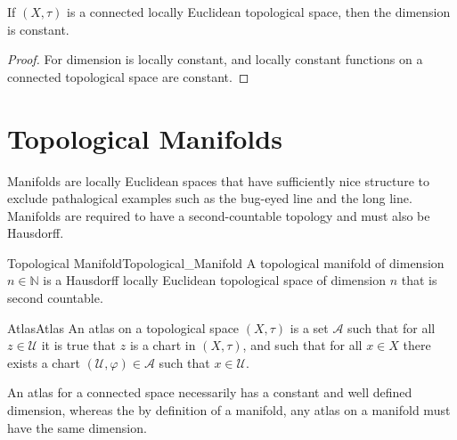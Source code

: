 \documentclass{article}                                                        %
\begin{document}
        \begin{theorem}
                If $(X,\tau)$ is a connected locally Euclidean topological
                space, then the dimension is constant.
        \end{theorem}
        \begin{proof}
                For dimension is locally constant, and locally constant
                functions on a connected topological space are constant.
        \end{proof}
    \section{Topological Manifolds}
        Manifolds are locally Euclidean spaces that have sufficiently nice
        structure to exclude pathalogical examples such as the bug-eyed line
        and the long line. Manifolds are required to have a second-countable
        topology and must also be Hausdorff.
        \begin{fdefinition}{Topological Manifold}{Topological_Manifold}
            A topological manifold of dimension $n\in\mathbb{N}$ is a
            Hausdorff locally Euclidean topological space of dimension $n$
            that is second countable.
        \end{fdefinition}
        \begin{fdefinition}{Atlas}{Atlas}
            An atlas on a topological space $(X,\tau)$ is a set
            $\mathcal{A}$ such that for all $z\in\mathcal{U}$ it is true
            that $z$ is a chart in $(X,\tau)$, and such that for all
            $x\in{X}$ there exists a chart
            $(\mathcal{U},\varphi)\in\mathcal{A}$ such that
            $x\in\mathcal{U}$.
        \end{fdefinition}
        An atlas for a connected space necessarily has a constant and well
        defined dimension, whereas the by definition of a manifold, any
        atlas on a manifold must have the same dimension.
\end{document}
